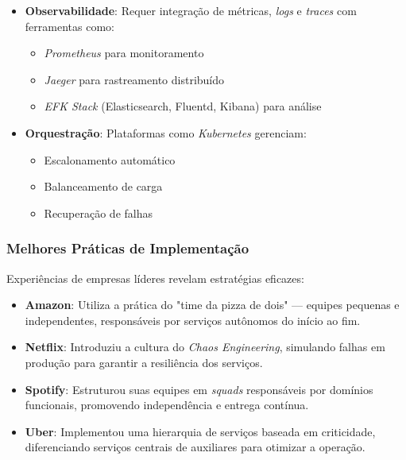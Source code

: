 \begin{itemize}
    \item \textbf{Observabilidade}: Requer integração de métricas, \textit{logs} e \textit{traces} com ferramentas como:
    \begin{itemize}
        \item \textit{Prometheus} para monitoramento
        \item \textit{Jaeger} para rastreamento distribuído
        \item \textit{EFK Stack} (Elasticsearch, Fluentd, Kibana) para análise
    \end{itemize}
    
    \item \textbf{Orquestração}: Plataformas como \textit{Kubernetes} gerenciam:
    \begin{itemize}
        \item Escalonamento automático
        \item Balanceamento de carga
        \item Recuperação de falhas
    \end{itemize}
\end{itemize}

\subsubsection{Melhores Práticas de Implementação}
Experiências de empresas líderes revelam estratégias eficazes:

\begin{itemize}
    \item \textbf{Amazon}: Utiliza a prática do "time da pizza de dois" — equipes pequenas e independentes, responsáveis por serviços autônomos do início ao fim.
    
    \item \textbf{Netflix}: Introduziu a cultura do \textit{Chaos Engineering}, simulando falhas em produção para garantir a resiliência dos serviços.

    \item \textbf{Spotify}: Estruturou suas equipes em \textit{squads} responsáveis por domínios funcionais, promovendo independência e entrega contínua.

    \item \textbf{Uber}: Implementou uma hierarquia de serviços baseada em criticidade, diferenciando serviços centrais de auxiliares para otimizar a operação.
\end{itemize}

